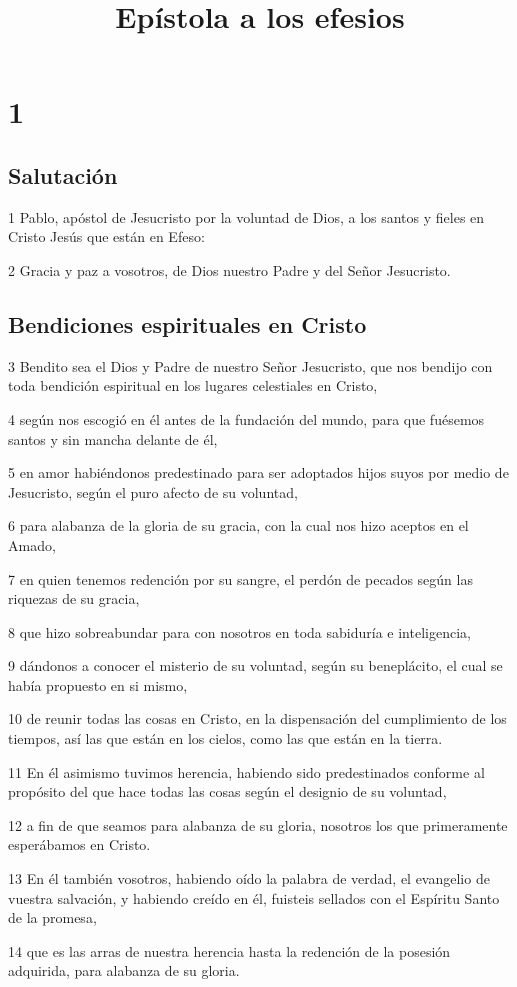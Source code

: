 
\title{Epístola a los efesios}

\chapter{1}

\section*{Salutación}

\par 1 Pablo, apóstol de Jesucristo por la voluntad de Dios, a los santos y fieles en Cristo Jesús que están en Efeso:
\par 2 Gracia y paz a vosotros, de Dios nuestro Padre y del Señor Jesucristo.

\section*{Bendiciones espirituales en Cristo}

\par 3 Bendito sea el Dios y Padre de nuestro Señor Jesucristo, que nos bendijo con toda bendición espiritual en los lugares celestiales en Cristo,
\par 4 según nos escogió en él antes de la fundación del mundo, para que fuésemos santos y sin mancha delante de él,
\par 5 en amor habiéndonos predestinado para ser adoptados hijos suyos por medio de Jesucristo, según el puro afecto de su voluntad,
\par 6 para alabanza de la gloria de su gracia, con la cual nos hizo aceptos en el Amado,
\par 7 en quien tenemos redención por su sangre, el perdón de pecados según las riquezas de su gracia,
\par 8 que hizo sobreabundar para con nosotros en toda sabiduría e inteligencia,
\par 9 dándonos a conocer el misterio de su voluntad, según su beneplácito, el cual se había propuesto en si mismo,
\par 10 de reunir todas las cosas en Cristo, en la dispensación del cumplimiento de los tiempos, así las que están en los cielos, como las que están en la tierra.
\par 11 En él asimismo tuvimos herencia, habiendo sido predestinados conforme al propósito del que hace todas las cosas según el designio de su voluntad,
\par 12 a fin de que seamos para alabanza de su gloria, nosotros los que primeramente esperábamos en Cristo.
\par 13 En él también vosotros, habiendo oído la palabra de verdad, el evangelio de vuestra salvación, y habiendo creído en él, fuisteis sellados con el Espíritu Santo de la promesa,
\par 14 que es las arras de nuestra herencia hasta la redención de la posesión adquirida, para alabanza de su gloria.

